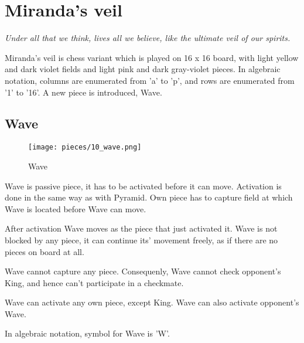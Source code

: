 
\chapter*{Miranda's veil}

\begin{flushright}
\parbox{0.8\textwidth}{
\emph{Under all that we think, lives all we believe, like the ultimate veil of our spirits. \\
 } }
\end{flushright}

\noindent
Miranda's veil is chess variant which is played on 16 x 16 board,
with light yellow and dark violet fields and light pink and dark
gray-violet pieces. In algebraic notation, columns are enumerated
from 'a' to 'p', and rows are enumerated from '1' to '16'. A new
piece is introduced, Wave.

\clearpage %

\section*{Wave}

\noindent
\begin{wrapfigure}[12]{l}{0.4\textwidth}
\texttt{[image: pieces/10\_wave.png]}
\caption{Wave}
\label{fig:wave}
\end{wrapfigure}
Wave is passive piece, it has to be activated before it can move.
Activation is done in the same way as with Pyramid. Own piece
has to capture field at which Wave is located before Wave can
move.

After activation Wave moves as the piece that just activated it.
Wave is not blocked by any piece, it can continue its' movement
freely, as if there are no pieces on board at all.

Wave cannot capture any piece. Consequenly, Wave cannot check
opponent's King, and hence can't participate in a checkmate.

Wave can activate any own piece, except King. Wave can also
activate opponent's Wave.

In algebraic notation, symbol for Wave is 'W'.

